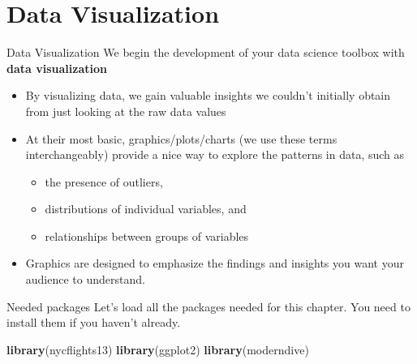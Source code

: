 \documentclass[
  ignorenonframetext,
]{beamer}
\newenvironment{Shaded}{\begin{snugshade}}{\end{snugshade}}
\newcommand{\FunctionTok}[1]{\textcolor[rgb]{0.13,0.29,0.53}{\textbf{#1}}}
\newcommand{\NormalTok}[1]{#1}
\providecommand{\tightlist}{%
  \setlength{\itemsep}{0pt}\setlength{\parskip}{0pt}}
\begin{document}
\hypertarget{data-visualization}{%
\section{Data Visualization}\label{data-visualization}}

\begin{frame}{Data Visualization}
\protect\hypertarget{data-visualization-1}{}
We begin the development of your data science toolbox with \textbf{data
visualization}

\begin{itemize}
\item
  By visualizing data, we gain valuable insights we couldn't initially
  obtain from just looking at the raw data values
\item
  At their most basic, graphics/plots/charts (we use these terms
  interchangeably) provide a nice way to explore the patterns in data,
  such as

  \begin{itemize}
  \tightlist
  \item
    the presence of outliers,
  \item
    distributions of individual variables, and
  \item
    relationships between groups of variables
  \end{itemize}
\item
  Graphics are designed to emphasize the findings and insights you want
  your audience to understand.
\end{itemize}
\end{frame}

\begin{frame}[fragile]{Needed packages}
\protect\hypertarget{needed-packages}{}
Let's load all the packages needed for this chapter. You need to install
them if you haven't already.

\small

\begin{Shaded}
\begin{Highlighting}[]
\FunctionTok{library}\NormalTok{(nycflights13)}
\FunctionTok{library}\NormalTok{(ggplot2)}
\FunctionTok{library}\NormalTok{(moderndive)}
\end{Highlighting}
\end{Shaded}

\normalsize
\end{frame}
\end{document}
